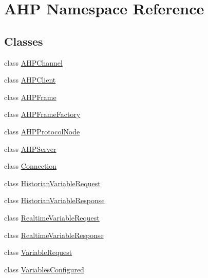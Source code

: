 \hypertarget{namespace_a_h_p}{}\section{A\+H\+P Namespace Reference}
\label{namespace_a_h_p}
\subsection*{Classes}
\begin{DoxyCompactItemize}
\item 
class \hyperlink{class_a_h_p_1_1_a_h_p_channel}{A\+H\+P\+Channel}
\item 
class \hyperlink{class_a_h_p_1_1_a_h_p_client}{A\+H\+P\+Client}
\item 
class \hyperlink{class_a_h_p_1_1_a_h_p_frame}{A\+H\+P\+Frame}
\item 
class \hyperlink{class_a_h_p_1_1_a_h_p_frame_factory}{A\+H\+P\+Frame\+Factory}
\item 
class \hyperlink{class_a_h_p_1_1_a_h_p_protocol_node}{A\+H\+P\+Protocol\+Node}
\item 
class \hyperlink{class_a_h_p_1_1_a_h_p_server}{A\+H\+P\+Server}
\item 
class \hyperlink{class_a_h_p_1_1_connection}{Connection}
\item 
class \hyperlink{class_a_h_p_1_1_historian_variable_request}{Historian\+Variable\+Request}
\item 
class \hyperlink{class_a_h_p_1_1_historian_variable_response}{Historian\+Variable\+Response}
\item 
class \hyperlink{class_a_h_p_1_1_realtime_variable_request}{Realtime\+Variable\+Request}
\item 
class \hyperlink{class_a_h_p_1_1_realtime_variable_response}{Realtime\+Variable\+Response}
\item 
class \hyperlink{class_a_h_p_1_1_variable_request}{Variable\+Request}
\item 
class \hyperlink{class_a_h_p_1_1_variables_configured}{Variables\+Configured}
\end{DoxyCompactItemize}
